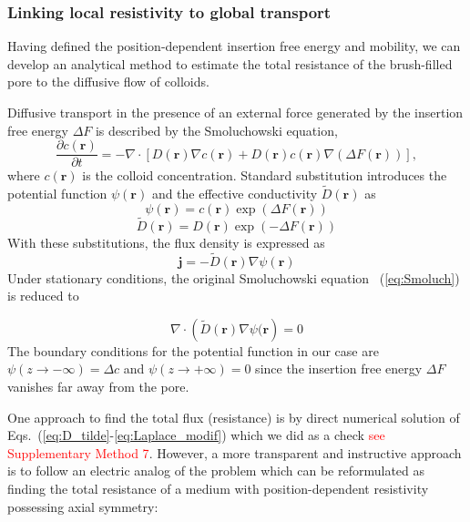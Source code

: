 \documentclass[12pt, a4paper]{article}
\newcommand\todo[1]{\textcolor{red}{#1}}
\begin{document}
\subsubsection{Linking local resistivity to global transport}

Having defined the position-dependent insertion free energy and mobility, we can develop an analytical method to estimate the total resistance of the brush-filled pore to the diffusive flow of colloids.

Diffusive transport in the presence of an external force generated by the insertion free energy $\Delta F$ is described by the Smoluchowski equation,
\begin{equation}
    \frac{\partial c(\bm{r})}{\partial t}=-\nabla \cdot \left[D(\bm{r}) \nabla c({\bm{r}})+D(\bm{r})c({\bm{r}})\nabla(\Delta F(\bm{r}))\right],
    \label{eq:Smoluch}
\end{equation}
where $c(\bm{r})$ is the colloid concentration.
Standard substitution introduces the potential function $\psi(\bm{r})$ and the effective conductivity $\tilde{D}(\bm{r})$ as
\begin{equation}
     \psi(\bm{r})=c(\bm{r})\exp(\Delta F(\bm{r}))
     \label{eq:psi} 
\end{equation}
\begin{equation}
    \tilde{D}(\bm{r})=D(\bm{r}) \exp(-\Delta F(\bm{r})) 
    \label{eq:D_tilde}
\end{equation}
With these substitutions, the flux density is expressed as
\begin{equation}
    \bm{j}=- \tilde{D}(\bm{r})  \nabla \psi(\bm{r})
    \label{eq:flux_psi}
\end{equation}
Under stationary conditions, the original Smoluchowski equation ~(\ref{eq:Smoluch}) is reduced to

\begin{equation}
    \nabla \cdot \left(\tilde{D}(\bm{r})\nabla\psi(\bm{r} \right)=0
    \label{eq:Laplace_modif}
\end{equation}
The boundary conditions for the potential function in our case are $\psi(z\rightarrow -\infty)=\Delta c$ and $\psi(z\rightarrow +\infty)=0$ since the insertion free energy $\Delta F$ vanishes far away from the pore.

One approach to find the total flux (resistance) is by direct numerical solution of Eqs.~(\ref{eq:D_tilde}-\ref{eq:Laplace_modif}) which we did as a check \todo{see Supplementary Method 7}.
However, a more transparent and instructive approach is to follow an electric analog of the problem which can be reformulated as finding the total resistance of a medium with position-dependent resistivity possessing axial symmetry:
\end{document}
